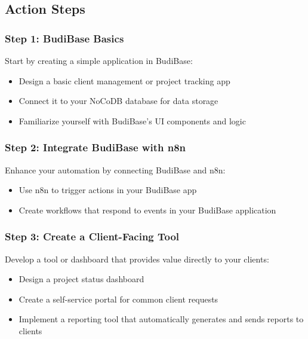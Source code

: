 \subsection{Action Steps}

\subsubsection{Step 1: BudiBase Basics}
Start by creating a simple application in BudiBase:

\begin{itemize}
    \item Design a basic client management or project tracking app
    \item Connect it to your NoCoDB database for data storage
    \item Familiarize yourself with BudiBase's UI components and logic
\end{itemize}


\subsubsection{Step 2: Integrate BudiBase with n8n}
Enhance your automation by connecting BudiBase and n8n:

\begin{itemize}
    \item Use n8n to trigger actions in your BudiBase app
    \item Create workflows that respond to events in your BudiBase application
\end{itemize}

\subsubsection{Step 3: Create a Client-Facing Tool}
Develop a tool or dashboard that provides value directly to your clients:

\begin{itemize}
    \item Design a project status dashboard
    \item Create a self-service portal for common client requests
    \item Implement a reporting tool that automatically generates and sends reports to clients
\end{itemize}


